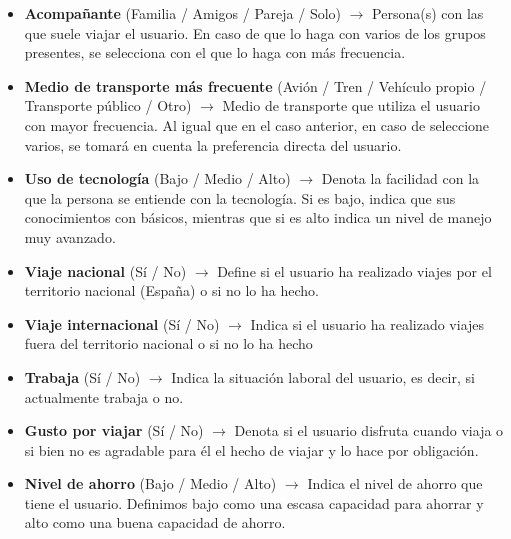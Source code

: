 \begin{itemize}
    \item \textbf{Acompañante} (Familia / Amigos / Pareja / Solo) $\rightarrow$ Persona(s) con las que suele viajar el usuario. En caso de que lo haga con varios de los grupos presentes, se selecciona con el que lo haga con más frecuencia.
    \item \textbf{Medio de transporte más frecuente} (Avión / Tren / Vehículo propio / Transporte público / Otro) $\rightarrow$ Medio de transporte que utiliza el usuario con mayor frecuencia. Al igual que en el caso anterior, en caso de seleccione varios, se tomará en cuenta la preferencia directa del usuario.
    \item \textbf{Uso de tecnología} (Bajo / Medio / Alto) $\rightarrow$ Denota la facilidad con la que la persona se entiende con la tecnología. Si es bajo, indica que sus conocimientos con básicos, mientras que si es alto indica un nivel de manejo muy avanzado.
    \item \textbf{Viaje nacional} (Sí / No) $\rightarrow$ Define si el usuario ha realizado viajes por el territorio nacional (España) o si no lo ha hecho.
    \item \textbf{Viaje internacional} (Sí / No) $\rightarrow$ Indica si el usuario ha realizado viajes fuera del territorio nacional o si no lo ha hecho
    \item \textbf{Trabaja} (Sí / No) $\rightarrow$ Indica la situación laboral del usuario, es decir, si actualmente trabaja o no.
    \item \textbf{Gusto por viajar} (Sí / No) $\rightarrow$ Denota si el usuario disfruta cuando viaja o si bien no es agradable para él el hecho de viajar y lo hace por obligación.
    \item \textbf{Nivel de ahorro} (Bajo / Medio / Alto) $\rightarrow$ Indica el nivel de ahorro que tiene el usuario. Definimos bajo como una escasa capacidad para ahorrar y alto como una buena capacidad de ahorro.
\end{itemize}

